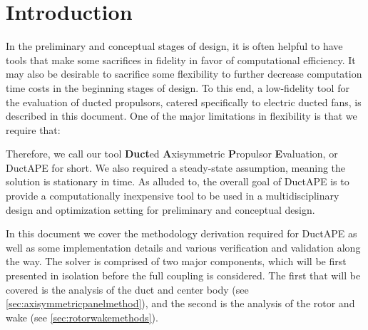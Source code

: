 \section{Introduction}
\label{sec:ductintro}

In the preliminary and conceptual stages of design, it is often helpful to have tools that make some sacrifices in fidelity in favor of computational efficiency.
%
It may also be desirable to sacrifice some flexibility to further decrease computation time costs in the beginning stages of design.
%
To this end, a low-fidelity tool for the evaluation of ducted propulsors, catered specifically to electric ducted fans, is described in this document.
%
One of the major limitations in flexibility is that we require that:

\begin{assumption}
    \label{asm:axisymmetric}




\end{assumption}

\noindent Therefore, we call our tool \textbf{Duct}ed \textbf{A}xisymmetric \textbf{P}ropulsor \textbf{E}valuation, or DuctAPE for short.
%
We also required a steady-state assumption, meaning the solution is stationary in time.
%
As alluded to, the overall goal of DuctAPE is to provide a computationally inexpensive tool to be used in a multidisciplinary design and optimization setting for preliminary and conceptual design.

In this document we cover the methodology derivation required for DuctAPE as well as some implementation details and various verification and validation along the way.
%
The solver is comprised of two major components, which will be first presented in isolation before the full coupling is considered.
%
The first that will be covered is the analysis of the duct and center body (see \cref{sec:axisymmetricpanelmethod}), and the second is the analysis of the rotor and wake (see \cref{sec:rotorwakemethods}).

